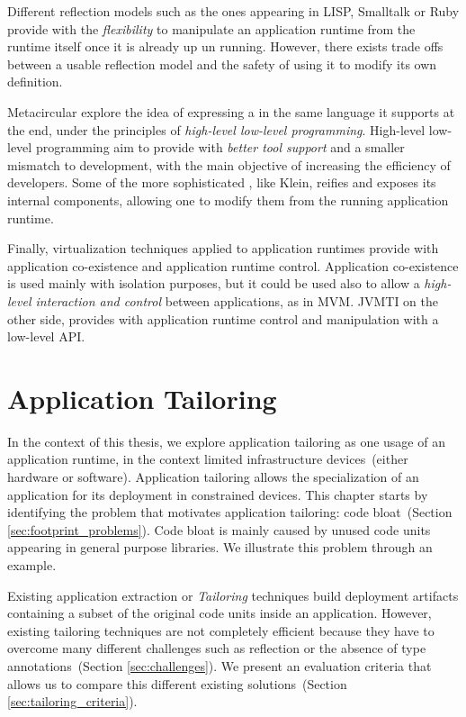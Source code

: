 Different reflection models such as the ones appearing in LISP, Smalltalk or Ruby provide with the \emph{flexibility} to manipulate an application runtime from the runtime itself once it is already up un running. However, there exists trade offs between a usable reflection model and the safety of using it to modify its own definition.

Metacircular \VMs explore the idea of expressing a \VM in the same language it supports at the end, under the principles of \emph{high-level low-level programming}. High-level low-level programming aim to provide with \emph{better tool support} and a smaller mismatch to \VM development, with the main objective of increasing the efficiency of \VM developers. Some of the more sophisticated \VMs, like Klein, reifies and exposes its internal components, allowing one to modify them from the running application runtime.

Finally, virtualization techniques applied to application runtimes provide with application co-existence and application runtime control. Application co-existence is used mainly with isolation purposes, but it could be used also to allow a \emph{high-level interaction and control} between applications, as in MVM. JVMTI on the other side, provides with application runtime control and manipulation with a low-level API.


\chapter{Application Tailoring}
\minitoc

In the context of this thesis, we explore application tailoring as one usage of an application runtime, in the context limited infrastructure devices~(either hardware or software).
Application tailoring allows the specialization of an application for its deployment in constrained devices.
This chapter starts by identifying the problem that motivates application tailoring: code bloat~(Section \ref{sec:footprint_problems}). Code bloat is mainly caused by unused code units appearing in general purpose libraries.
We illustrate this problem through an example.

Existing application extraction or \emph{Tailoring} techniques build deployment artifacts containing a subset of the original code units inside an application. However, existing tailoring techniques are not completely efficient because they have to overcome many different challenges such as reflection or the absence of type annotations~(Section \ref{sec:challenges}). We present an evaluation criteria that allows us to compare this different existing solutions~(Section \ref{sec:tailoring_criteria}).

